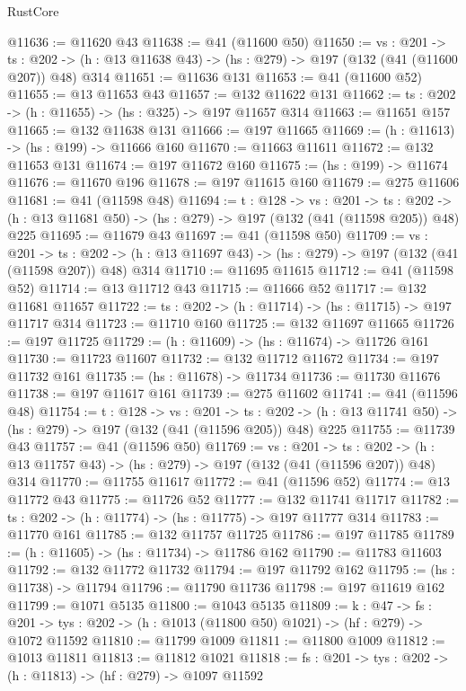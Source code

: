 \begin{lexlean}{RustCore}
\begin{coremodule}
@11636 := @11620 @43
@11638 := @41 (@11600 @50)
@11650 := {vs : @201} ->
  {ts : @202} -> (h : @13 @11638 @43) -> (hs : @279) -> @197 (@132 (@41 (@11600 @207)) @48) @314
@11651 := @11636 @131
@11653 := @41 (@11600 @52)
@11655 := @13 @11653 @43
@11657 := @132 @11622 @131
@11662 := {ts : @202} -> (h : @11655) -> (hs : @325) -> @197 @11657 @314
@11663 := @11651 @157
@11665 := @132 @11638 @131
@11666 := @197 @11665
@11669 := (h : @11613) -> (hs : @199) -> @11666 @160
@11670 := @11663 @11611
@11672 := @132 @11653 @131
@11674 := @197 @11672 @160
@11675 := (hs : @199) -> @11674
@11676 := @11670 @196
@11678 := @197 @11615 @160
@11679 := @275 @11606
@11681 := @41 (@11598 @48)
@11694 := {t : @128} ->
  {vs : @201} ->
  {ts : @202} -> (h : @13 @11681 @50) -> (hs : @279) -> @197 (@132 (@41 (@11598 @205)) @48) @225
@11695 := @11679 @43
@11697 := @41 (@11598 @50)
@11709 := {vs : @201} ->
  {ts : @202} -> (h : @13 @11697 @43) -> (hs : @279) -> @197 (@132 (@41 (@11598 @207)) @48) @314
@11710 := @11695 @11615
@11712 := @41 (@11598 @52)
@11714 := @13 @11712 @43
@11715 := @11666 @52
@11717 := @132 @11681 @11657
@11722 := {ts : @202} -> (h : @11714) -> (hs : @11715) -> @197 @11717 @314
@11723 := @11710 @160
@11725 := @132 @11697 @11665
@11726 := @197 @11725
@11729 := (h : @11609) -> (hs : @11674) -> @11726 @161
@11730 := @11723 @11607
@11732 := @132 @11712 @11672
@11734 := @197 @11732 @161
@11735 := (hs : @11678) -> @11734
@11736 := @11730 @11676
@11738 := @197 @11617 @161
@11739 := @275 @11602
@11741 := @41 (@11596 @48)
@11754 := {t : @128} ->
  {vs : @201} ->
  {ts : @202} -> (h : @13 @11741 @50) -> (hs : @279) -> @197 (@132 (@41 (@11596 @205)) @48) @225
@11755 := @11739 @43
@11757 := @41 (@11596 @50)
@11769 := {vs : @201} ->
  {ts : @202} -> (h : @13 @11757 @43) -> (hs : @279) -> @197 (@132 (@41 (@11596 @207)) @48) @314
@11770 := @11755 @11617
@11772 := @41 (@11596 @52)
@11774 := @13 @11772 @43
@11775 := @11726 @52
@11777 := @132 @11741 @11717
@11782 := {ts : @202} -> (h : @11774) -> (hs : @11775) -> @197 @11777 @314
@11783 := @11770 @161
@11785 := @132 @11757 @11725
@11786 := @197 @11785
@11789 := (h : @11605) -> (hs : @11734) -> @11786 @162
@11790 := @11783 @11603
@11792 := @132 @11772 @11732
@11794 := @197 @11792 @162
@11795 := (hs : @11738) -> @11794
@11796 := @11790 @11736
@11798 := @197 @11619 @162
@11799 := @1071 @5135
@11800 := @1043 @5135
@11809 := {k : @47} ->
  {fs : @201} -> {tys : @202} -> (h : @1013 (@11800 @50) @1021) -> (hf : @279) -> @1072 @11592
@11810 := @11799 @1009
@11811 := @11800 @1009
@11812 := @1013 @11811
@11813 := @11812 @1021
@11818 := {fs : @201} -> {tys : @202} -> (h : @11813) -> (hf : @279) -> @1097 @11592

\end{coremodule}
\end{lexlean}
